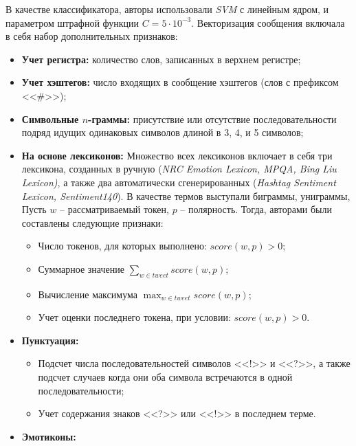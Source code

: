     В качестве классификатора, авторы использовали {\it SVM} с линейным ядром, и
    параметром штрафной функции $C = 5\cdot 10^{-3}$.
    Векторизация сообщения включала в себя набор дополнительных признаков:
    \begin{itemize}
        \item {\bf Учет регистра:} количество слов, записанных в верхнем регистре;
        \item {\bf Учет хэштегов:} число входящих в сообщение хэштегов (слов с префиксом <<\#>>);
        \item {\bf Символьные $n$-граммы:} присутствие или отсутствие последовательности
            подряд идущих одинаковых символов длиной в 3, 4, и 5 символов;
        \item {\bf На основе лексиконов:}
            Множество всех лексиконов включает в себя три лексикона, созданных
            в ручную ({\it NRC Emotion Lexicon, MPQA, Bing Liu Lexicon)}, а также
            два автоматически сгенерированных ({\it Hashtag Sentiment Lexicon,
            Sentiment140}). В качестве термов выступали биграммы, униграммы,
            Пусть $w$ -- рассматриваемый токен, $p$ -- полярность. Тогда,
            авторами были составлены следующие признаки:%
            \begin{itemize}
                \item Число токенов, для которых выполнено: $score(w, p) > 0$;
                \item Суммарное значение $\sum_{w \in tweet} score(w,p)$;
                \item Вычисление максимума $\max_{w \in tweet} score(w,p)$;
                \item Учет оценки последнего токена, при условии: $score(w,p) > 0$.
            \end{itemize}
        \item {\bf Пунктуация:}
            \begin{itemize}
                \item Подсчет числа последовательностей символов <<!>> и <<?>>,
                    а также подсчет случаев когда они оба символа встречаются в одной последовательности;
                \item Учет содержания знаков <<?>> или <<!>> в последнем терме.
            \end{itemize}
        \item {\bf Эмотиконы:}
            \begin{itemize}

\end{itemize}
\end{itemize}
